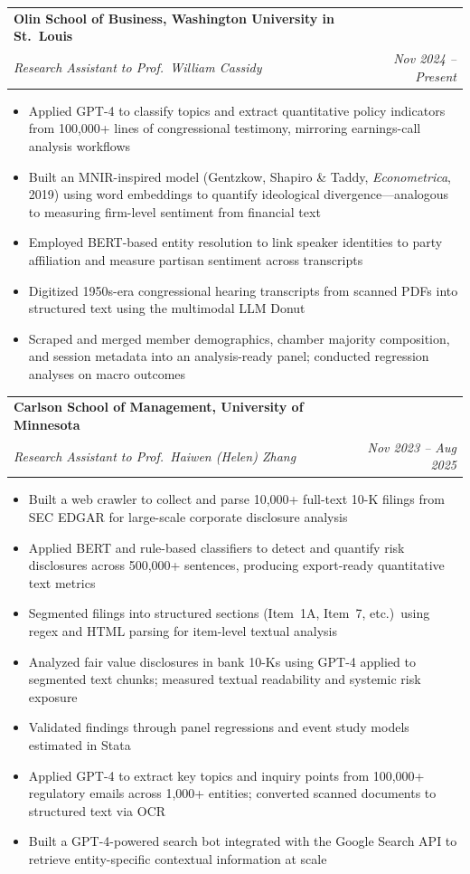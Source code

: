 \documentclass[letterpaper,11pt]{article}
\makeatletter
\newcommand{\resumeItem}[1]{
  \item\small{#1 \vspace{-2pt}}
}
\newcommand{\resumeSubheading}[4]{
  \vspace{-2pt}\item
    \begin{tabular*}{0.97\textwidth}[t]{l@{\extracolsep{\fill}}r}
      \textbf{#1} & \small #2 \\
      \textit{\small#3} & \textit{\small #4} \\
    \end{tabular*}\vspace{-7pt}
}
\newcommand{\resumeItemListStart}{\begin{itemize}}
\newcommand{\resumeItemListEnd}{\end{itemize}\vspace{-5pt}}
\makeatother
\begin{document}
  \resumeSubheading
    {Olin School of Business, Washington University in St.\ Louis}{}
    {Research Assistant to Prof.\ William Cassidy \normalfont{(Empirical Macro-Finance)}}{Nov 2024 -- Present}
    \resumeItemListStart
      \resumeItem{Applied GPT-4 to classify topics and extract quantitative policy indicators from 100,000+ lines of congressional testimony, mirroring earnings-call analysis workflows}
      \resumeItem{Built an MNIR-inspired model (Gentzkow, Shapiro \& Taddy, \textit{Econometrica}, 2019) using word embeddings to quantify ideological divergence---analogous to measuring firm-level sentiment from financial text}
      \resumeItem{Employed BERT-based entity resolution to link speaker identities to party affiliation and measure partisan sentiment across transcripts}
      \resumeItem{Digitized 1950s-era congressional hearing transcripts from scanned PDFs into structured text using the multimodal LLM Donut}
      \resumeItem{Scraped and merged member demographics, chamber majority composition, and session metadata into an analysis-ready panel; conducted regression analyses on macro outcomes}
    \resumeItemListEnd

  \resumeSubheading
    {Carlson School of Management, University of Minnesota}{}
    {Research Assistant to Prof.\ Haiwen (Helen) Zhang \normalfont{(Corporate Text Analysis)}}{Nov 2023 -- Aug 2025}
    \resumeItemListStart
      \resumeItem{Built a web crawler to collect and parse 10,000+ full-text 10-K filings from SEC EDGAR for large-scale corporate disclosure analysis}
      \resumeItem{Applied BERT and rule-based classifiers to detect and quantify risk disclosures across 500,000+ sentences, producing export-ready quantitative text metrics}
      \resumeItem{Segmented filings into structured sections (Item~1A, Item~7, etc.)\ using regex and HTML parsing for item-level textual analysis}
      \resumeItem{Analyzed fair value disclosures in bank 10-Ks using GPT-4 applied to segmented text chunks; measured textual readability and systemic risk exposure}
      \resumeItem{Validated findings through panel regressions and event study models estimated in Stata}
      \resumeItem{Applied GPT-4 to extract key topics and inquiry points from 100,000+ regulatory emails across 1,000+ entities; converted scanned documents to structured text via OCR}
      \resumeItem{Built a GPT-4-powered search bot integrated with the Google Search API to retrieve entity-specific contextual information at scale}
    \resumeItemListEnd
\end{document}
